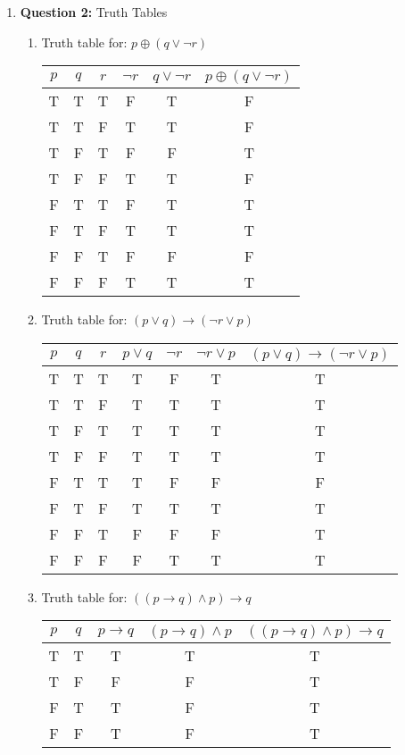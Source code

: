 \documentclass[11pt]{article}
\begin{document}
\begin{enumerate}
\item
\textbf{Question 2:}
Truth Tables
\begin{enumerate}[label=(\alph*)]
\item
Truth table for: $p \oplus (q \vee \lnot r)$ \\
\begin{tabular}{|c|c|c|c|c|c|} \hline
$p$ & $q$ & $r$ & $\lnot r$ & $q \vee \lnot r$ & $p \oplus (q \vee \lnot r)$ \\
\hline
T & T & T & F & T & F \\
\hline
T & T & F & T & T & F \\
\hline
T & F & T & F & F & T \\
\hline
T & F & F & T & T & F \\
\hline
F & T & T & F & T & T \\
\hline
F & T & F & T & T & T \\
\hline
F & F & T & F & F & F \\
\hline
F & F & F & T & T & T \\
\hline
\end{tabular}
\item
Truth table for: $(p \vee q) \rightarrow (\lnot r \vee p)$ \\
\begin{tabular}{|c|c|c|c|c|c|c|} \hline
$p$ & $q$ & $r$ & $p \vee q$ & $\lnot r$ & $\lnot r \vee p$ & $(p \vee q) \rightarrow (\lnot r \vee p)$ \\
\hline
T & T & T & T & F & T & T \\
\hline
T & T & F & T & T & T & T \\
\hline
T & F & T & T & T & T & T \\
\hline
T & F & F & T & T & T & T \\
\hline
F & T & T & T & F & F & F \\
\hline
F & T & F & T & T & T & T \\
\hline
F & F & T & F & F & F & T \\
\hline
F & F & F & F & T & T & T \\
\hline
\end{tabular}

\item 
Truth table for: $((p \rightarrow q) \wedge p) \rightarrow q$ \\
\begin{tabular}{|c|c|c|c|c|} \hline
$p$ & $q$ & $p \rightarrow q$ & $(p \rightarrow q) \wedge p$ & $((p \rightarrow q) \wedge p) \rightarrow q$ \\
\hline
T & T & T & T & T \\
\hline
T & F & F & F & T \\
\hline
F & T & T & F & T \\
\hline
F & F & T & F & T \\
\hline
\end{tabular}
\end{enumerate}


\end{enumerate}
\end{document}
